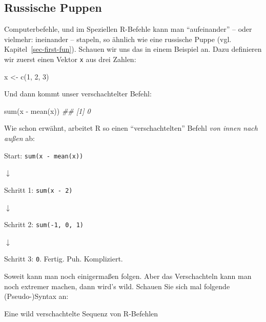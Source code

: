 \documentclass[
  letterpaper,
  oneside,
  open=any]{scrbook}
\newenvironment{Shaded}{\begin{snugshade}}{\end{snugshade}}
\newcommand{\DecValTok}[1]{\textcolor[rgb]{0.68,0.00,0.00}{#1}}
\newcommand{\DocumentationTok}[1]{\textcolor[rgb]{0.37,0.37,0.37}{\textit{#1}}}
\newcommand{\FunctionTok}[1]{\textcolor[rgb]{0.28,0.35,0.67}{#1}}
\newcommand{\NormalTok}[1]{\textcolor[rgb]{0.00,0.23,0.31}{#1}}
\newcommand{\OtherTok}[1]{\textcolor[rgb]{0.00,0.23,0.31}{#1}}
\newcommand{\SpecialCharTok}[1]{\textcolor[rgb]{0.37,0.37,0.37}{#1}}
\theoremstyle{definition}
\theoremstyle{definition}
\theoremstyle{definition}
\theoremstyle{remark}
\begin{document}
\subsection{Russische Puppen}\label{russische-puppen}

Computerbefehle, und im Speziellen R-Befehle kann man
\enquote{aufeinander} -- oder vielmehr: ineinander -- stapeln, so
ähnlich wie eine russische Puppe (vgl. Kapitel~\ref{sec-first-fun}).
Schauen wir uns das in einem Beispiel an. Dazu definieren wir zuerst
einen Vektor \texttt{x} aus drei Zahlen:

\begin{Shaded}
\begin{Highlighting}[]
\NormalTok{x }\OtherTok{\textless{}{-}} \FunctionTok{c}\NormalTok{(}\DecValTok{1}\NormalTok{, }\DecValTok{2}\NormalTok{, }\DecValTok{3}\NormalTok{)}
\end{Highlighting}
\end{Shaded}

Und dann kommt unser verschachtelter Befehl:

\begin{Shaded}
\begin{Highlighting}[]
\FunctionTok{sum}\NormalTok{(x }\SpecialCharTok{{-}} \FunctionTok{mean}\NormalTok{(x))}
\DocumentationTok{\#\# [1] 0}
\end{Highlighting}
\end{Shaded}

Wie schon erwähnt, arbeitet R so einen \enquote{verschachtelten} Befehl
\emph{von innen nach außen} ab:

Start: \texttt{sum(x\ -\ mean(x))}

{\(\downarrow\)}

Schritt 1: \texttt{sum(x\ -\ 2)}

{\(\downarrow\)}

Schritt 2: \texttt{sum(-1,\ 0,\ 1)}

{\(\downarrow\)}

Schritt 3: \texttt{0}. Fertig. Puh. Kompliziert.

Soweit kann man noch einigermaßen folgen. Aber das Verschachteln kann
man noch extremer machen, dann wird's wild. Schauen Sie sich mal
folgende (Pseudo-)Syntax an:

\begin{codelisting}

\caption{\label{lst-schachtel}Eine wild verschachtelte Sequenz von
R-Befehlen}

\centering{

\begin{Shaded}
\begin{Highlighting}[]
\FunctionTok{fasse\_zusammen}\NormalTok{(}
  \FunctionTok{gruppiere}\NormalTok{(}
\NormalTok{    wähle}\FunctionTok{\_spalten}\NormalTok{(}
      \FunctionTok{filter\_zeilen}\NormalTok{(meine\_daten))))}
\end{Highlighting}
\end{Shaded}

}

\end{codelisting}%
\end{document}
